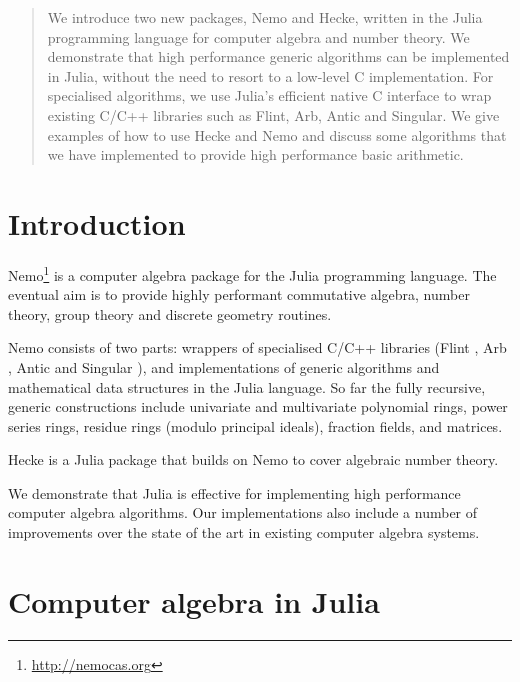 \documentclass{sig-alternate-05-2015}
\begin{document}
\begin{abstract}
We introduce two new packages, Nemo and Hecke, written in the Julia programming language
for computer algebra and number theory.
We demonstrate that high performance generic
algorithms can be implemented in Julia, without the need to resort to a low-level C
implementation.
For specialised algorithms, we use Julia's efficient
native C interface to wrap
existing C/C++ libraries such
as Flint, Arb, Antic and Singular.
We give examples of how to use Hecke and Nemo and discuss
some algorithms that we have implemented to provide high performance basic
arithmetic.
\end{abstract}


\section{Introduction}

Nemo\footnote{\url{http://nemocas.org}} is a computer algebra package for the Julia programming language.
The eventual aim is
to provide highly performant commutative algebra, number theory, group theory and discrete
geometry routines.

Nemo consists of two parts: wrappers of specialised C/C++
libraries (Flint \cite{flint}, Arb \cite{arb}, Antic \cite{antic} and Singular
\cite{singular}), and
implementations of generic algorithms and mathematical data
structures in the Julia language. So far the fully recursive, generic constructions include
univariate and multivariate
polynomial rings, power series rings, residue rings (modulo principal ideals),
fraction fields, and matrices.

Hecke is a Julia package that builds on Nemo to cover algebraic number theory.

We demonstrate
that Julia is effective for implementing high performance computer
algebra algorithms. Our implementations also
include a number of
improvements over the state of the art
in existing computer algebra systems.


\section{Computer algebra in Julia}
\label{sect:domains}
\end{document}
